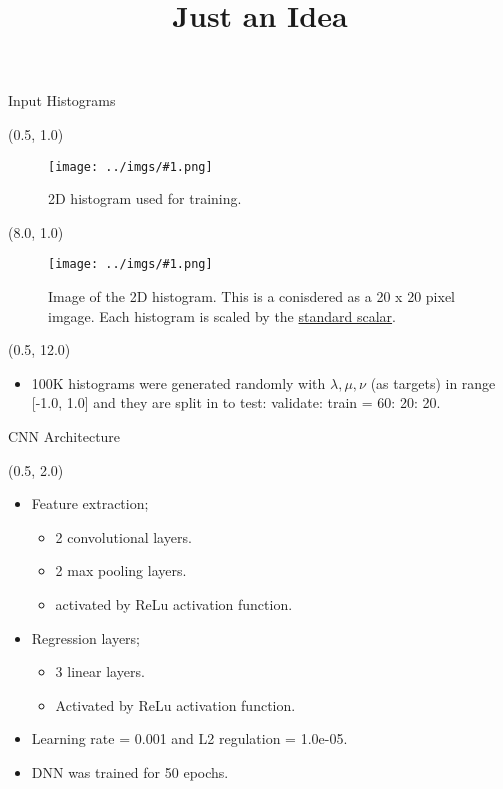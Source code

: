 \documentclass[10pt, xcolor={dvipsnames}, aspectratio = 169, sans,mathserif]{beamer}
\title{Just an Idea}
\newcommand{\leftpic}[2]
{
\begin{textblock}{7.0}(0.5, 1.0)
\begin{figure}
    \centering
    \texttt{[image: ../imgs/\#1.png]}
    \caption{#2}
\end{figure}
\end{textblock}
}
\newcommand{\rightpic}[2]
{
\begin{textblock}{7.0}(8.0, 1.0)
\begin{figure}
    \centering
    \texttt{[image: ../imgs/\#1.png]}
    \caption{#2}
\end{figure}
\end{textblock}
}
\begin{document}
\begin{frame}
    \maketitle
\end{frame}

\begin{frame}[fragile]{Input Histograms}

\leftpic{train_hist}{2D histogram used for training.}

\rightpic{gray_toy}{Image of the 2D histogram. This is a conisdered as a 20 x 20 pixel imgage. Each histogram is scaled by the \href{https://scikit-learn.org/stable/modules/generated/sklearn.preprocessing.StandardScaler.html}{standard scalar}.}

\begin{textblock}{15.0}(0.5, 12.0)
\begin{itemize}

    \item 100K histograms were generated randomly with $\lambda, \mu, \nu$ (as targets) in range [-1.0, 1.0] and they are split in to test: validate: train = 60: 20: 20.

\end{itemize}
\end{textblock}
\end{frame}

\begin{frame}{CNN Architecture}
\begin{textblock}{15.0}(0.5, 2.0)
\begin{itemize}

    \item Feature extraction;

    \begin{itemize}
        \item 2 convolutional layers.
        \item 2 max pooling layers.
        \item activated by ReLu activation function.
    \end{itemize}

    \item Regression layers;

    \begin{itemize}
        \item 3 linear layers.
        \item Activated by ReLu activation function.
    \end{itemize}

    \item Learning rate = 0.001 and L2 regulation = 1.0e-05.

    \item DNN was trained for 50 epochs.
\end{itemize}
\end{textblock}
\end{frame}
\end{document}
